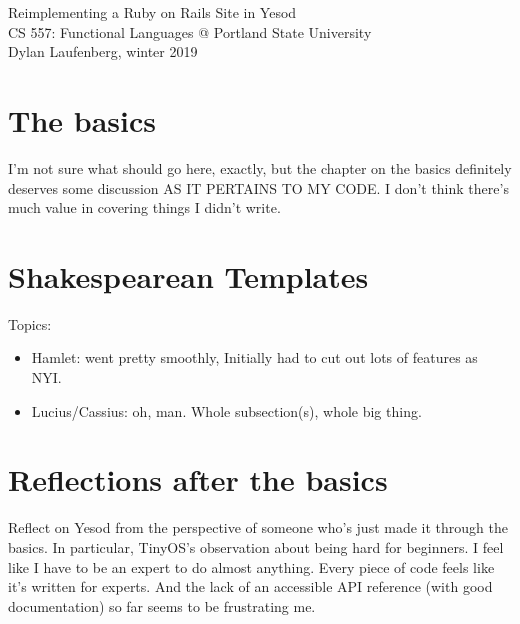 \documentclass{article}
\begin{document}
\begin{center}
    \Huge Reimplementing a Ruby on Rails Site in Yesod \\
    \large CS 557: Functional Languages @ Portland State University \\
    Dylan Laufenberg, winter 2019
\end{center}




\section{The basics}

I'm not sure what should go here, exactly, but the chapter on the basics definitely deserves some discussion AS IT PERTAINS TO MY CODE. I don't think there's much value in covering things I didn't write.

\section{Shakespearean Templates}

Topics:
\begin{itemize}
  \item Hamlet: went pretty smoothly, Initially had to cut out lots of features as NYI.
  \item Lucius/Cassius: oh, man. Whole subsection(s), whole big thing.
\end{itemize}

\section{Reflections after the basics}

Reflect on Yesod from the perspective of someone who's just made it through the basics. In particular, TinyOS's observation about being hard for beginners. I feel like I have to be an expert to do almost anything. Every piece of code feels like it's written for experts. And the lack of an accessible API reference (with good documentation) so far seems to be frustrating me.

% 
% 
% 
% 

\printbibliography
\end{document}
